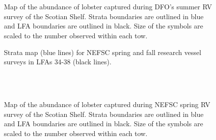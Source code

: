 \documentclass[11pt]{article}
\newcommand{\D}{.}
\newcommand{\e}{/SpinDr/backup/bio_data/bio.lobster/figures/LFA3438Framework2019/} %
\begin{document}
        \begin{figure}
        \centering
           \\
        \\
    
       \caption{Map of the abundance of lobster captured during DFO's summer RV survey of the Scotian Shelf. Strata boundaries are outlined in blue and LFA  boundaries are outlined in black. Size of the symbols are scaled to the number observed within each tow.}
        \end{figure}
        \clearpage

    \begin{figure}
    \centering
        \caption{Strata map (blue lines) for NEFSC spring and fall research vessel surveys in LFAs 34-38 (black lines).}
    \end{figure}


        \begin{figure}
        \centering
           \\
        \\
    
       \caption{Map of the abundance of lobster captured during NEFSC spring RV survey of the Scotian Shelf. Strata boundaries are outlined in blue and LFA  boundaries are outlined in black. Size of the symbols are scaled to the number observed within each tow.}
        \end{figure}
        \clearpage
\end{document}
